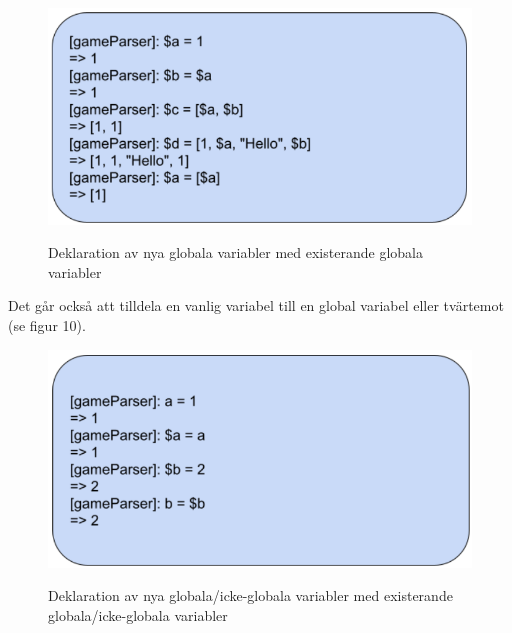 \documentclass{Dokumentmall}
\begin{document}
\begin{figure}[h!]
  \centering
  \includegraphics[scale = 0.65]{Images/Figur9.png}
  \label{}
  \caption{Deklaration av nya globala variabler med existerande globala variabler}
\end{figure}

Det går också att tilldela en vanlig variabel till en global variabel eller tvärtemot (se figur 10).

\begin{figure}[h!]
  \centering
  \includegraphics[scale = 0.65]{Images/Figur10.png}
  \label{}
  \caption{Deklaration av nya globala/icke-globala variabler med existerande globala/icke-globala variabler}
\end{figure}

\newpage
\end{document}
